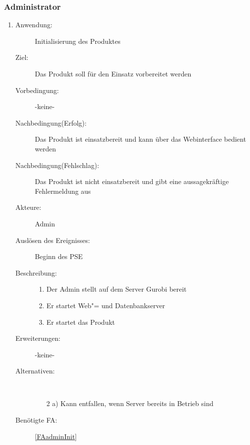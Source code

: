 \documentclass[parskip=full]{scrartcl}
\newcommand{\swtLabel}[1]{\textbf{/#1\arabic*0/}}
\begin{document}
\subsubsection{Administrator}
\begin{enumerate} [label=\swtLabel{A}]
	
	\item \label{UCadminInit}
	\begin{description}
		\item[Anwendung:] Initialisierung des Produktes
		\item[Ziel:] Das Produkt soll für den Einsatz vorbereitet werden
		\item[Vorbedingung:] -keine-
		\item[Nachbedingung(Erfolg):] Das Produkt ist einsatzbereit und kann über das Webinterface bedient werden
		\item[Nachbedingung(Fehlschlag):] Das Produkt ist nicht einsatzbereit und gibt
		eine aussagekräftige Fehlermeldung aus
		\item[Akteure:] \gls{Admin}
		\item[Auslösen des Ereignisses:] Beginn des \gls{PSE}
		\item[Beschreibung:]
		\begin{enumerate} [label=\arabic*.]~
			\item Der \gls{Admin} stellt auf dem Server Gurobi bereit %
			\item Er startet Web"= und Datenbankserver 
			\item Er startet das Produkt
		\end{enumerate}
		\item[Erweiterungen:] -keine-
		\item[Alternativen:]~
		\begin{enumerate}
			\item[2 a)] Kann entfallen, wenn Server bereits in Betrieb sind
		\end{enumerate}
		\item[Benötigte FA:] \ref{FAadminInit}
	\end{description}
	

\end{enumerate}
\end{document}
